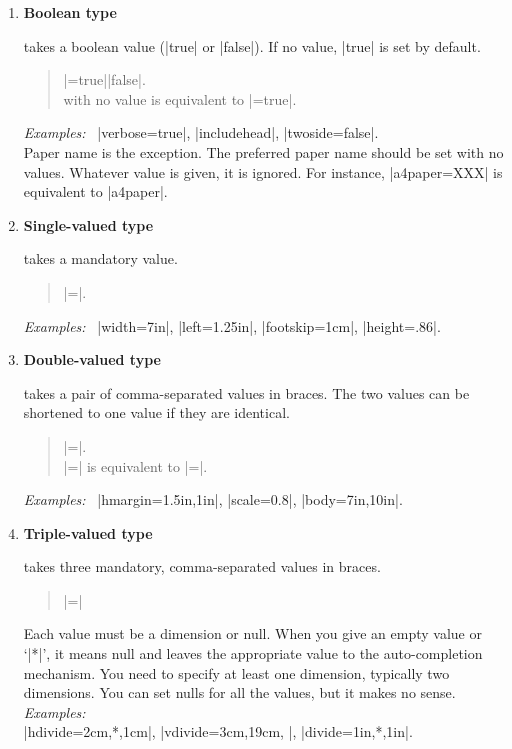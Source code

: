 \begin{enumerate}\itemsep=0pt
\item \textbf{Boolean type}

   takes a boolean value (|true| or |false|). If no value,
   |true| is set by default.
   \begin{quote}
      |=true|\OR|false|.\\
       with no value is equivalent to 
      |=true|.
   \end{quote}
   \textit{Examples:}~ |verbose=true|, |includehead|, 
   |twoside=false|.\\
   Paper name is the exception. The preferred paper name should be set
   with no values. Whatever value is given, it is ignored. For
   instance, |a4paper=XXX| is equivalent to |a4paper|.

\item \textbf{Single-valued type}

   takes a mandatory value.
   \begin{quote}
   |=|.
   \end{quote}
   \textit{Examples:}~ |width=7in|, |left=1.25in|,
   |footskip=1cm|, |height=.86\paperheight|.

\item \textbf{Double-valued type}

   takes a pair of comma-separated values in braces. The two values can
   be shortened to one value if they are identical.
   \begin{quote}
   |=|.\\
   |=| is equivalent to 
             |=|.
   \end{quote}
   \textit{Examples:}~ |hmargin={1.5in,1in}|, |scale=0.8|,
   |body={7in,10in}|.

\item \textbf{Triple-valued type}

   takes three mandatory, comma-separated values in braces.
   \begin{quote}
   |=|
   \end{quote}
   Each value must be a dimension or null. When you give an empty value
   or `|*|', it means null and leaves the appropriate value 
   to the auto-completion mechanism. You need to specify at least one
   dimension, typically two dimensions. You can set nulls for all the 
   values, but it makes no sense.
   \textit{Examples:}\\
   \hspace*{2em} |hdivide={2cm,*,1cm}|, |vdivide={3cm,19cm, }|,
                  |divide={1in,*,1in}|.
\end{enumerate}
